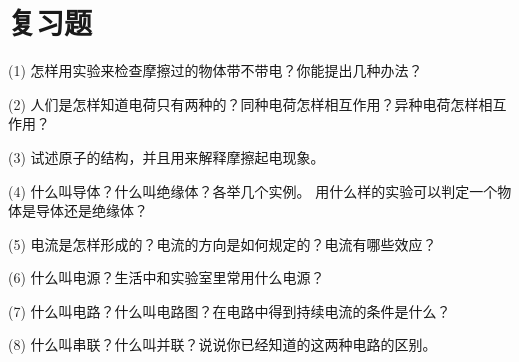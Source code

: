 \section*{复习题}

(1) 怎样用实验来检查摩擦过的物体带不带电？你能提出几种办法？

(2) 人们是怎样知道电荷只有两种的？同种电荷怎样相互作用？异种电荷怎样相互作用？

(3) 试述原子的结构，并且用来解释摩擦起电现象。

(4) 什么叫导体？什么叫绝缘体？各举几个实例。
用什么样的实验可以判定一个物体是导体还是绝缘体？

(5) 电流是怎样形成的？电流的方向是如何规定的？电流有哪些效应？

(6) 什么叫电源？生活中和实验室里常用什么电源？

(7) 什么叫电路？什么叫电路图？在电路中得到持续电流的条件是什么？

(8) 什么叫串联？什么叫并联？说说你已经知道的这两种电路的区别。

